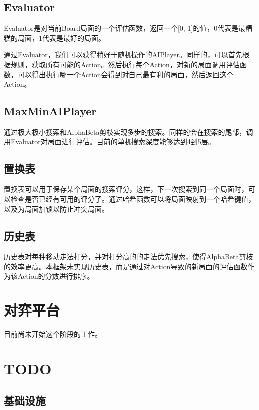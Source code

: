 \documentclass[export, 12pt, letterpaper]{ctexrep}
\begin{document}
\section{Evaluator}

Evaluator是对当前Board局面的一个评估函数，返回一个[0, 1]的值，0代表是最糟糕的局面，1代表是最好的局面。

通过Evaluator，我们可以获得稍好于随机操作的AIPlayer。同样的，可以首先根据规则，获取所有可能的Action。然后执行每个Action，对新的局面调用评估函数，可以得出执行哪一个Action会得到对自己最有利的局面，然后返回这个Action。

\section{MaxMinAIPlayer}

通过极大极小搜索和AlphaBeta剪枝实现多步的搜索。同样的会在搜索的尾部，调用Evaluator对局面进行评估。目前的单机搜索深度能够达到4到5层。

\section{置换表}

置换表可以用于保存某个局面的搜索评分，这样，下一次搜索到同一个局面时，可以检查是否已经有可用的评分了。通过哈希函数可以将局面映射到一个哈希键值，以及为局面加锁以防止冲突局面。

\section{历史表}

历史表对每种移动走法打分，并对打分高的的走法优先搜索，使得AlphaBeta剪枝的效率更高。本框架未实现历史表，而是通过对Action导致的新局面的评估函数作为该Action的分数进行排序。

\chapter{对弈平台}

目前尚未开始这个阶段的工作。

\chapter{TODO}

\section{基础设施}
\end{document}
